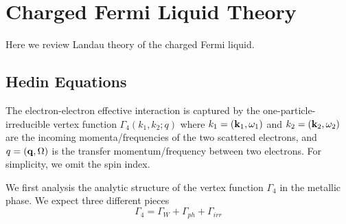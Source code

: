 \documentclass[reprint,amsmath,amssymb,aps,prb]{revtex4-1}
\begin{document}




\appendix
\section{Charged Fermi Liquid Theory}
\label{appendix:FL}

Here we review Landau theory of the charged Fermi liquid.

\subsection{Hedin Equations}

The electron-electron effective interaction is captured by the one-particle-irreducible vertex function $\Gamma_4(k_1, k_2; q)$ where $k_1=(\mathbf{k}_1, \omega_1)$ and $k_2=(\mathbf{k}_2, \omega_2)$ are the incoming momenta/frequencies of the two scattered electrons, and $q=(\mathbf{q}, \Omega)$ is the transfer momentum/frequency between two electrons. For simplicity, we omit the spin index.

We first analysis the analytic structure of the vertex function $\Gamma_4$ in the metallic phase. We expect three different pieces
\begin{equation}
    \Gamma_4=\Gamma_W+\Gamma_{ph}+\Gamma_{irr}
\end{equation}
\end{document}
